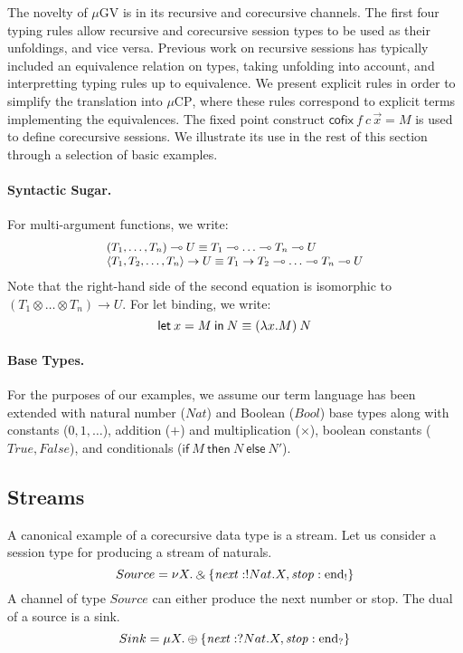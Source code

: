 \documentclass[orivec,envcountsame]{llncs}
\makeatletter
\newcommand{\with}{\mathbin\binampersand}
\newcommand{\lto}{\ensuremath{\multimap}}
\newcommand{\uto}{\ensuremath{\rightarrow}}
\newcommand{\outterm}{\mathrm{end}_!}
\newcommand{\interm}{\mathrm{end}_?}
\newcommand{\mkwd}[1]{\mathsf{#1}}
\newcommand{\clabel}[1]{\mathit{#1}}
\newcommand{\lrkwd}{\mkwd{cofix}}
\newcommand{\gvfix}[3]{\lrkwd\:#1\:#2 = #3}
\newcommand{\gvifthen}[3]{\mkwd{if}\:#1\:\mkwd{then}\:#2\:\mkwd{else}\:#3}
\newcommand{\key}{\mkwd}
\newcommand{\mucp}{$\mu\mathrm{CP}$\xspace}
\newcommand{\mugv}{$\mu\mathrm{GV}$\xspace}
\newcommand{\ba}{\begin{array}}
\newcommand{\ea}{\end{array}}
\newcommand{\bl}{\ba[t]{@{}l@{}}}
\newcommand{\el}{\ea}
\newcommand{\secref}[1]{(\S\ref{sec:#1})}
\makeatother
\begin{document}
The novelty of \mugv is in its recursive and corecursive channels. The first four typing rules allow
recursive and corecursive session types to be used as their unfoldings, and vice versa. Previous
work on recursive sessions has typically included an equivalence relation on types, taking unfolding
into account, and interpretting typing rules up to equivalence. We present explicit rules in order
to simplify the translation into \mucp, where these rules correspond to explicit terms implementing
the equivalences.
%
The fixed point construct $\gvfix{f}{c\,\vec{x}}{M}$ is used to define corecursive sessions. We
illustrate its use in the rest of this section through a selection of basic examples.

\paragraph{Syntactic Sugar.}

For multi-argument functions, we write:
\[
\small
  \bl
  (T_1, \dots, T_n) \lto U \equiv T_1 \lto \dots \lto T_n \lto U \\
  \langle T_1, T_2, \dots, T_n \rangle \uto U \equiv T_1 \uto T_2 \lto \dots \lto T_n \lto U \\
  \el
\]
Note that the right-hand side of the second equation is isomorphic to $(T_1 \otimes \dots \otimes
T_n) \uto U$.
%
For let binding, we write:
\[
\small
\key{let}\:x=M\:\key{in}\:N \equiv (\lambda x.M)\:N
\]

\paragraph{Base Types.}

For the purposes of our examples, we assume our term language has been extended with natural number
($Nat$) and Boolean ($Bool$) base types along with constants ($0,1,\dots$),
addition ($+$) and multiplication ($\times$), boolean constants ($True, False$), and conditionals
($\gvifthen{M}{N}{N'}$).
%

\subsection{Streams}

A canonical example of a corecursive data type is a stream. Let us consider a session type for
producing a stream of naturals.
%
\[\small
Source = \nu X.\with \{\clabel{next}: !Nat.X, \clabel{stop}: \outterm \}
\]
%
A channel of type $Source$ can either produce the next number or stop. The dual of a source is a
sink.
\[\small
Sink = \mu X.\oplus \{\clabel{next}: ?Nat.X, \clabel{stop}: \interm \}
\]
\end{document}
